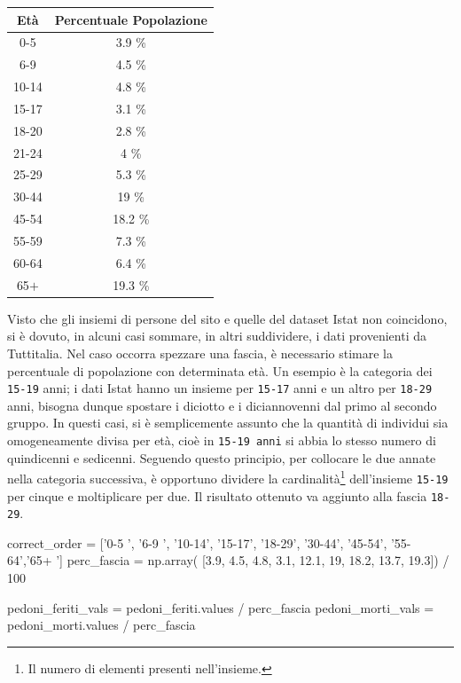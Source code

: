 \documentclass[a4paper,12pt]{report}
\newcommand{\columnstyle}[1]{\texttt{#1}}
\begin{document}
\begin{center}
    \def\arraystretch{1.5}%
    \begin{tabular}{ |c|c| } 
    \hline
    Età & Percentuale Popolazione \\ 
    \hline
    \rowcolor{TableGray}
    0-5     & 3.9 \% \\ 
    6-9     & 4.5 \% \\
    \rowcolor{TableGray}
    10-14   & 4.8 \% \\
    15-17   & 3.1 \% \\
    \rowcolor{TableGray}
    18-20   & 2.8 \% \\ 
    21-24   & 4   \% \\
    \rowcolor{TableGray}
    25-29   & 5.3 \% \\
    30-44   & 19  \% \\
    \rowcolor{TableGray}
    45-54   & 18.2 \% \\ 
    55-59   & 7.3 \% \\
    \rowcolor{TableGray}
    60-64   & 6.4 \% \\
    65$+$   & 19.3 \% \\
    \hline
    \end{tabular}
\end{center}

Visto che gli insiemi di persone del sito e quelle del dataset Istat non coincidono, 
si è dovuto, in alcuni casi sommare, in altri suddividere, 
i dati provenienti da Tuttitalia. 
Nel caso occorra spezzare una fascia, è necessario stimare la percentuale 
di popolazione con determinata età. 
Un esempio è la categoria dei \columnstyle{15-19} anni; 
i dati Istat hanno un insieme per \columnstyle{15-17} anni e un altro per 
\columnstyle{18-29} anni, 
bisogna dunque spostare i diciotto e i diciannovenni dal primo al 
secondo gruppo. 
In questi casi, si è semplicemente assunto che la quantità di individui sia omogeneamente 
divisa per età, cioè in \columnstyle{15-19 anni} si abbia lo stesso numero di 
quindicenni e sedicenni. 
Seguendo questo principio, per collocare le due annate nella categoria successiva, 
è opportuno dividere la cardinalità\footnote{Il numero di elementi presenti nell'insieme.} 
dell'insieme \columnstyle{15-19} per cinque e moltiplicare per due. 
Il risultato ottenuto va aggiunto alla fascia \columnstyle{18-29}. 

\begin{code}
correct_order = ['0-5  ', '6-9  ', '10-14', '15-17', '18-29', '30-44', '45-54', '55-64','65+  ']
perc_fascia = np.array( [3.9, 4.5, 4.8, 3.1, 12.1, 19, 18.2, 13.7, 19.3]) / 100

pedoni_feriti_vals = pedoni_feriti.values / perc_fascia
pedoni_morti_vals = pedoni_morti.values / perc_fascia
\end{code}
\end{document}

